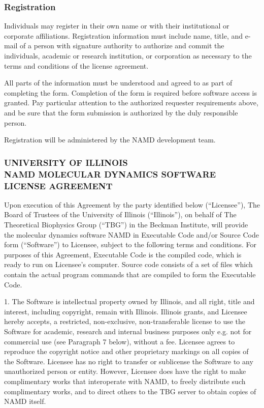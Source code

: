 \subsubsection*{Registration}

Individuals may register in their own name or with their institutional or
corporate affiliations. Registration information must include name, title, 
and e-mail of a person with signature authority to authorize and commit the
individuals, academic or research institution, or corporation as necessary 
to the terms and conditions of the license agreement.

All parts of the information must be understood and agreed to as part of
completing the form. Completion of the form is required before software 
access is granted. Pay particular attention to the authorized requester 
requirements above, and be sure that the form submission is authorized 
by the duly responsible person.

Registration will be administered by the NAMD development team.

\newpage
\subsubsection*{UNIVERSITY OF ILLINOIS \\
NAMD MOLECULAR DYNAMICS SOFTWARE LICENSE AGREEMENT}

Upon execution of this Agreement by the party identified below (``Licensee''),
The Board of Trustees of the University of Illinois (``Illinois''), on 
behalf of The Theoretical Biophysics Group (``TBG'') in the Beckman Institute,
will provide the molecular dynamics software NAMD in Executable 
Code and/or Source Code form (``Software'') to Licensee, subject to 
the following terms and conditions. For purposes of this Agreement, 
Executable Code is the compiled code, which is ready to run on Licensee's 
computer. Source code consists of a set of files which contain the 
actual program commands that are compiled to form the Executable Code.

1. The Software is intellectual property owned by Illinois, and all 
right, title and interest, including copyright, remain with Illinois. 
Illinois grants, and Licensee hereby accepts, a restricted, non-exclusive, 
non-transferable license to use the Software for academic, research 
and internal business purposes only e.g. not for commercial use 
(see Paragraph 7 below), without a fee. Licensee agrees to reproduce 
the copyright notice and other proprietary markings on all copies of 
the Software. Licensee has no right to transfer or sublicense the 
Software to any unauthorized person or entity. However, Licensee does 
have the right to make complimentary works that interoperate with NAMD, 
to freely distribute such complimentary works, and to direct others 
to the TBG server to obtain copies of NAMD itself.

